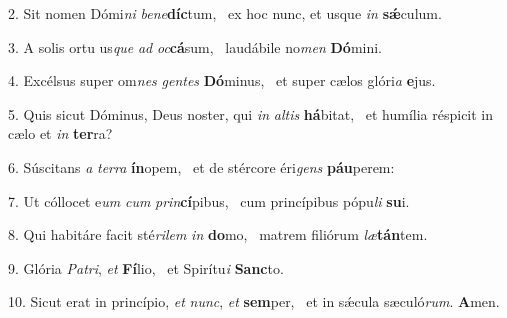 2. Sit nomen Dómi\textit{ni} \textit{be}\textit{ne}\textbf{díc}tum, \ast\  ex hoc nunc, et usque \textit{in} \textbf{sǽ}culum.\

3. A solis ortu us\textit{que} \textit{ad} \textit{oc}\textbf{cá}sum, \ast\  laudábile no\textit{men} \textbf{Dó}mini.\

4. Excélsus super om\textit{nes} \textit{gen}\textit{tes} \textbf{Dó}minus, \ast\  et super cælos glóri\textit{a} \textbf{e}jus.\

5. Quis sicut Dóminus, Deus noster, qui \textit{in} \textit{al}\textit{tis} \textbf{há}bitat, \ast\  et humília réspicit in cælo et \textit{in} \textbf{ter}ra?\

6. Súscitans \textit{a} \textit{ter}\textit{ra} \textbf{ín}opem, \ast\  et de stércore éri\textit{gens} \textbf{páu}perem:\

7. Ut cóllocet e\textit{um} \textit{cum} \textit{prin}\textbf{cí}pibus, \ast\  cum princípibus pópu\textit{li} \textbf{su}i.\

8. Qui habitáre facit sté\textit{ri}\textit{lem} \textit{in} \textbf{do}mo, \ast\  matrem filiórum \textit{læ}\textbf{tán}tem.\

9. Glória \textit{Pa}\textit{tri}, \textit{et} \textbf{Fí}lio, \ast\  et Spirítu\textit{i} \textbf{Sanc}to.\

10. Sicut erat in princípio, \textit{et} \textit{nunc}, \textit{et} \textbf{sem}per, \ast\  et in sǽcula sæculó\textit{rum}. \textbf{A}men.\

